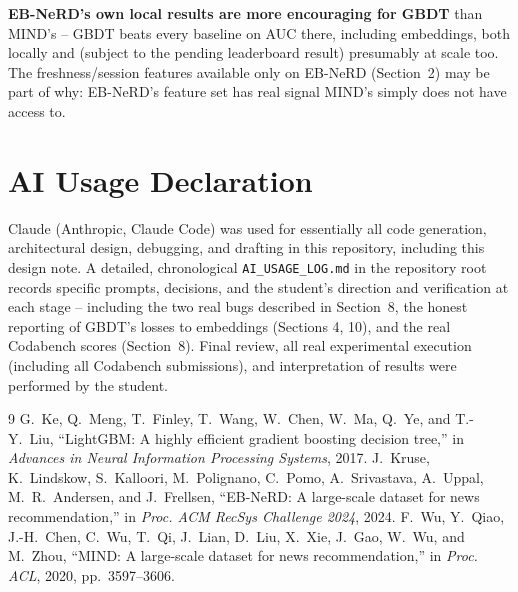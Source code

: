 \documentclass[11pt,a4paper]{article}
\begin{document}
\textbf{EB-NeRD's own local results are more encouraging for GBDT} than MIND's --
GBDT beats every baseline on AUC there, including embeddings, both locally and (subject
to the pending leaderboard result) presumably at scale too. The freshness/session
features available only on EB-NeRD (Section~2) may be part of why: EB-NeRD's feature
set has real signal MIND's simply does not have access to.

\section*{AI Usage Declaration}

Claude (Anthropic, Claude Code) was used for essentially all code generation,
architectural design, debugging, and drafting in this repository, including this
design note. A detailed, chronological \texttt{AI\_USAGE\_LOG.md} in the repository
root records specific prompts, decisions, and the student's direction and verification
at each stage -- including the two real bugs described in Section~8, the honest
reporting of GBDT's losses to embeddings (Sections 4, 10), and the real Codabench
scores (Section~8). Final review, all real experimental execution (including all
Codabench submissions), and interpretation of results were performed by the student.

\begin{thebibliography}{9}
 G.~Ke, Q.~Meng, T.~Finley, T.~Wang, W.~Chen, W.~Ma, Q.~Ye, and
T.-Y.~Liu, ``LightGBM: A highly efficient gradient boosting decision tree,'' in
\emph{Advances in Neural Information Processing Systems}, 2017.
 J.~Kruse, K.~Lindskow, S.~Kalloori, M.~Polignano, C.~Pomo,
A.~Srivastava, A.~Uppal, M.~R.~Andersen, and J.~Frellsen, ``EB-NeRD: A large-scale
dataset for news recommendation,'' in \emph{Proc. ACM RecSys Challenge 2024}, 2024.
 F.~Wu, Y.~Qiao, J.-H.~Chen, C.~Wu, T.~Qi, J.~Lian, D.~Liu,
X.~Xie, J.~Gao, W.~Wu, and M.~Zhou, ``MIND: A large-scale dataset for news
recommendation,'' in \emph{Proc. ACL}, 2020, pp.~3597--3606.
\end{thebibliography}
\end{document}
